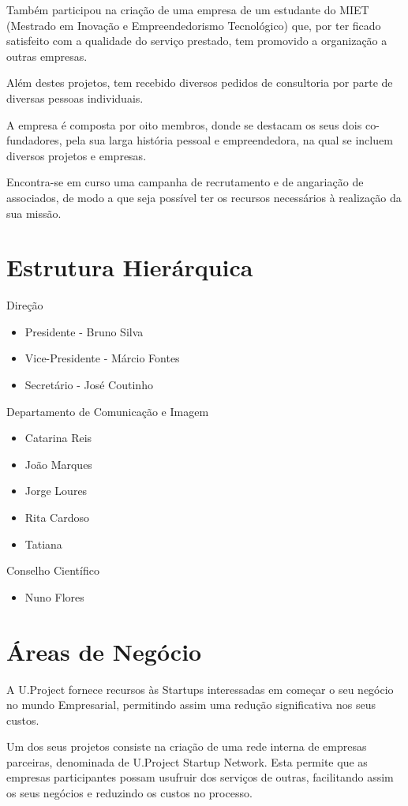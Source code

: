 \documentclass[11pt]{report}
\begin{document}
Também participou na criação de uma empresa de um estudante do MIET (Mestrado em Inovação e Empreendedorismo Tecnológico) que, por ter ficado satisfeito com a qualidade do serviço prestado, tem promovido a organização a outras empresas.

Além destes projetos, tem recebido diversos pedidos de consultoria por parte de diversas pessoas individuais.

A empresa é composta por oito membros, donde se destacam os seus dois co-fundadores, pela sua larga história pessoal e empreendedora, na qual se incluem diversos projetos e empresas. 

Encontra-se em curso uma campanha de recrutamento e de angariação de associados, de modo a que seja possível ter os recursos necessários à realização da sua missão.
\section{Estrutura Hierárquica}

Direção
\begin{itemize}
\item Presidente - Bruno Silva
\item Vice-Presidente - Márcio Fontes
\item Secretário - José Coutinho
\end{itemize}
Departamento de Comunicação e Imagem
\begin{itemize}
\item Catarina Reis
\item João Marques
\item Jorge Loures
\item Rita Cardoso
\item Tatiana
\end{itemize}
Conselho Científico
\begin{itemize}
\item Nuno Flores
\end{itemize}

\section{Áreas de Negócio}
A U.Project fornece recursos às Startups interessadas em começar o seu negócio no mundo Empresarial, permitindo assim uma redução significativa nos seus custos.

Um dos seus projetos consiste na criação de uma rede interna de empresas parceiras, denominada de U.Project Startup Network. Esta permite que as empresas participantes possam usufruir dos serviços de outras, facilitando assim os seus negócios e reduzindo os custos no processo.
\end{document}
